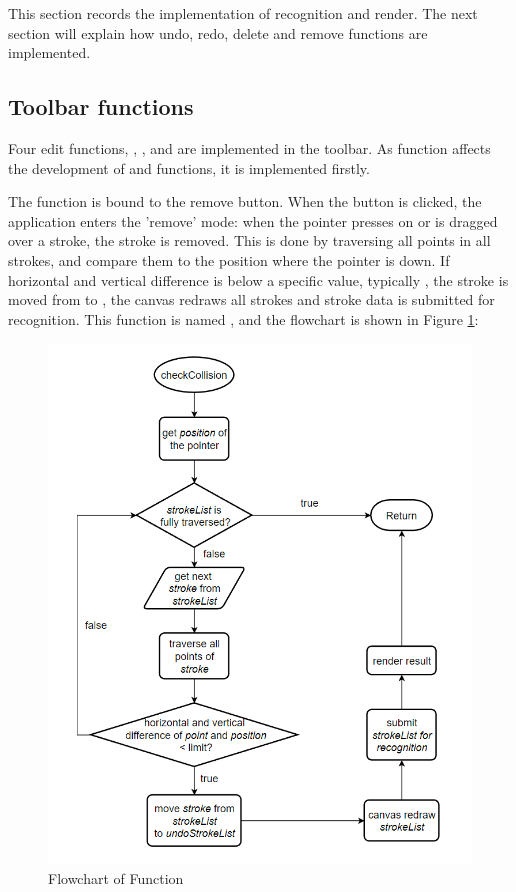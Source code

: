 \documentclass[12pt,twoside]{report}
\begin{document}
This section records the implementation of recognition and render. The next section will explain how undo, redo, delete and remove functions are implemented.

\subsection{Toolbar functions}
Four edit functions, , ,  and  are implemented in the toolbar. As  function affects the development of  and  functions, it is implemented firstly.

The  function is bound to the remove button. When the button is
clicked, the application enters the 'remove' mode: when the pointer presses on
or is dragged over a stroke, the stroke is removed. This is done by traversing
all points in all strokes, and compare them to the position where the pointer is
down. If horizontal and vertical difference is below a specific value, typically
, the stroke is moved from  to ,  the canvas
redraws all strokes and stroke data is submitted for recognition. This function
is named , and the flowchart is shown in Figure \ref{fig:flowchart-remove}:
\begin{figure}[H]
    \centering
    \includegraphics[width=0.8\linewidth, frame]{figures/flowchart-remove.png}
    \caption{Flowchart of Function }
    \label{fig:flowchart-remove}
\end{figure}
\end{document}
